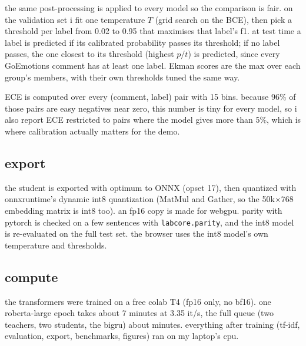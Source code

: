 the same post-processing is applied to every model so the comparison is fair. on the validation set i fit
one temperature $T$ (grid search on the BCE), then pick a threshold per label from 0.02 to 0.95 that
maximises that label's f1. at test time a label is predicted if its calibrated probability passes its
threshold; if no label passes, the one closest to its threshold (highest $p/t$) is predicted, since every
GoEmotions comment has at least one label. Ekman scores are the max over each group's members, with their own
thresholds tuned the same way.

ECE is computed over every (comment, label) pair with 15 bins. because 96\% of those pairs are easy negatives
near zero, this number is tiny for every model, so i also report ECE restricted to pairs where the model
gives more than 5\%, which is where calibration actually matters for the demo.

\subsection{export}

the student is exported with optimum \cite{optimum} to ONNX (opset 17), then quantized with onnxruntime's
dynamic int8 quantization (MatMul and Gather, so the 50k$\times$768 embedding matrix is int8 too). an fp16
copy is made for webgpu. parity with pytorch is checked on a few sentences with \texttt{labcore.parity}, and
the int8 model is re-evaluated on the full test set. the browser uses the int8 model's own temperature and
thresholds.

\subsection{compute}

the transformers were trained on a free colab T4 (fp16 only, no bf16). one roberta-large epoch takes about 7
minutes at 3.35 it/s, the full queue (two teachers, two students, the bigru) about  minutes.
everything after training (tf-idf, evaluation, export, benchmarks, figures) ran on my laptop's cpu.
